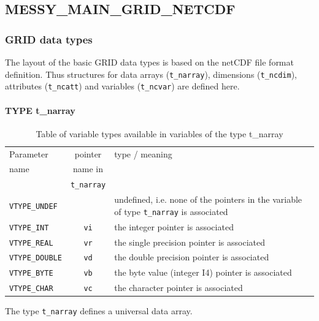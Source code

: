 \documentclass[11pt,twoside]{article}
\begin{document}
\subsection{MESSY\_MAIN\_GRID\_NETCDF \label{MMGN}}

\subsubsection{GRID data types}
The layout of the basic GRID data types is based on the netCDF file
format definition.
Thus structures for data arrays (\verb|t_narray|), dimensions 
(\verb|t_ncdim|), attributes (\verb|t_ncatt|) and variables (\verb|t_ncvar|)
are defined here.

\paragraph{TYPE t\_narray\label{Tnarray}\\}
\begin{table}[t]
\begin{center}
\begin{tabular}{|lcp{10cm}|}\hline
Parameter& pointer  &type / meaning\\
  name &  name in & \\
       & \verb|t_narray| &\\\hline
\verb|VTYPE_UNDEF|  &&  undefined, i.e. none of the pointers in the variable of type \verb|t_narray| is associated\\
\verb|VTYPE_INT|    & \verb|vi|& the integer pointer is associated\\
\verb|VTYPE_REAL|   & \verb|vr| &the single precision pointer is associated\\
\verb|VTYPE_DOUBLE| & \verb|vd| &the double precision pointer is associated\\
\verb|VTYPE_BYTE|   & \verb|vb| &the byte value (integer I4) pointer is associated\\
\verb|VTYPE_CHAR|   & \verb|vc| &the character pointer is associated \\\hline
\end{tabular}
\caption{Table of variable types available in variables of the type
  {\rm t\_narray }\label{typetab}}
\end{center}
\end{table}
The type \verb|t_narray| defines a universal data array. 
\end{document}
